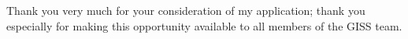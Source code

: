 \documentclass[10pt,letterpaper,dateno,sigright]{newlfm} %
\begin{document}
\begin{newlfm}
Thank you very much for your consideration of my application; thank you especially for making this opportunity available to all members of the GISS team.



 

\end{newlfm}
\end{document}
